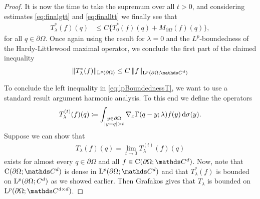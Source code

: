 \begin{proof}
   It is now the time to take the supremum over all $t > 0$, and considering estimates \eqref{eq:finalgtt} and \eqref{eq:finalltt} we finally see that
   \begin{align*}
     T_\lambda^*(f)(q)
     &\leq C \Big\{  T_0^*(f)(q)+ M_{\partial\Omega}(f)(q) \Big\},
   \end{align*}
   for all $q \in \partial\Omega$. Once again using the result for $\lambda = 0$ and the $L^p$-boundedness of the Hardy-Littlewood maximal operator, we conclude the first part of the claimed inequality
   \begin{align*}
     \|T_\lambda^*(f) \|_{\Ell^p(\partial\Omega)} \leq C\, \|f\|_{\Ell^p(\partial\Omega; \C^d)}
   \end{align*}

   To conclude the left inequality in \eqref{eq:lpBoundednessT}, we want to use a standard result argument harmonic analysis.
   To this end we define the operators
   \begin{align*}
     T_\lambda^{(t)}(f)(q) \coloneqq \int_{\substack{y \in \partial\Omega \\ |y - q| > t}} \nabla_x \Gamma(q - y; \lambda) f(y) \, {\operatorname{d}\!{\sigma}}(y).
   \end{align*}
   Suppose we can show that
   \begin{align}
     \label{eq:pointwiseLimit}
     T_\lambda(f)(q) = \lim_{t \to 0} T_\lambda^{(t)}(f)(q) 
   \end{align}
   exists for almost every $q \in \partial\Omega$ and all $f \in \CC(\partial\Omega; \C^d)$. Now, note that $\CC(\partial\Omega; \C^d)$ is dense in $\Ell^p(\partial\Omega; \C^d)$ and that $T_\lambda^*(f)$ is bounded on $\mathrm{L}^p(\partial\Omega; C^d)$ as we showed earlier.
   Then Grafakos \cite[Thm. 2.1.14]{grafakos2014classical} gives that $T_\lambda$ is bounded on $\Ell^p(\partial\Omega; \C^{d\times d})$.


\end{proof}
